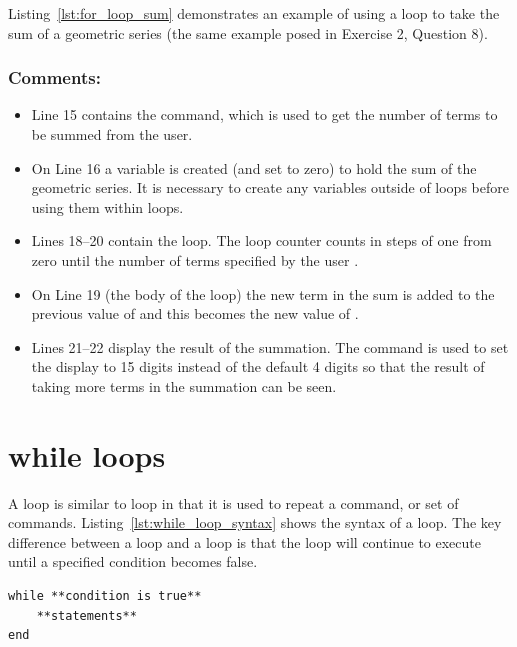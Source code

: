 Listing~\ref{lst:for_loop_sum} demonstrates an example of using a  loop to take the sum of a geometric series (the same example posed in Exercise 2, Question 8). 


\subsubsection{Comments:}
\begin{itemize}
\item Line 15 contains the  command, which is used to get the number of terms to be summed from the user.
\item On Line 16 a variable  is created (and set to zero) to hold the sum of the geometric series. It is necessary to create any variables outside of loops before using them within loops.
\item Lines 18--20 contain the  loop. The loop counter  counts in steps of one from zero until the number of terms specified by the user .
\item On Line 19 (the body of the loop) the new term in the sum  is added to the previous value of  and this becomes the new value of .
\item Lines 21--22 display the result of the summation. The  command is used to set the display to 15 digits instead of the default 4 digits so that the result of taking more terms in the summation can be seen.
\end{itemize}

\section{while loops}
A  loop is similar to  loop in that it is used to repeat a command, or set of commands. Listing~\ref{lst:while_loop_syntax} shows the syntax of a  loop. The key difference between a  loop and a  loop is that the  loop will continue to execute until a specified condition becomes false. 
\begin{lstlisting}[caption={Syntax of a \mcode{while} loop},label=lst:while_loop_syntax]
while **condition is true**
	**statements**
end
\end{lstlisting}

